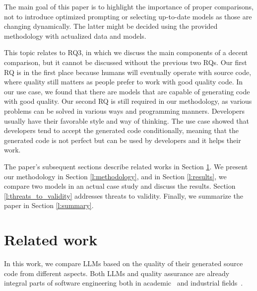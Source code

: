 The main goal of this paper is to highlight the importance of proper comparisons, not to introduce optimized prompting or selecting up-to-date models as those are changing dynamically.
The latter might be decided using the provided methodology with actualized data and models.

This topic relates to RQ3, in which we discuss the main components of a decent comparison, but it cannot be discussed without the previous two RQs.
Our first RQ is in the first place because humans will eventually operate with source code, where quality still matters as people prefer to work with good quality code.
In our use case, we found that there are models that are capable of generating code with good quality.
Our second RQ is still required in our methodology, as various problems can be solved in various ways and programming manners.
Developers usually have their favorable style and way of thinking.
The use case showed that developers tend to accept the generated code conditionally, meaning that the generated code is not perfect but can be used by developers and it helps their work.


The paper's subsequent sections describe related works in Section \ref{l:related_work}.
We present our methodology in Section \ref{l:methodology}, and in Section \ref{l:results}, we compare two models in an actual case study and discuss the results.
Section \ref{l:threats_to_validity} addresses threats to validity.
Finally, we summarize the paper in Section \ref{l:summary}.
\section{Related work}
\label{l:related_work}

In this work, we compare LLMs based on the quality of their generated source code from different aspects.
Both LLMs and quality assurance are already integral parts of software engineering both in academic~\cite{academic_sonar_usage, academic_sonar_usage2} and industrial fields~\cite{sonarqube_good_active}.%


